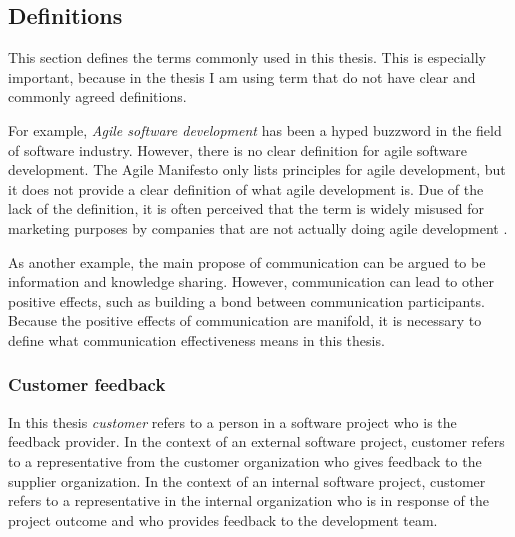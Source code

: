 \documentclass[english,12pt,a4paper,pdftex]{article}
\begin{document}
\subsection{Definitions}

This section defines the terms commonly used in this thesis. This is especially important, because in the thesis I am using term that do not have clear and commonly agreed definitions. 

For example, \emph{Agile software development} has been a hyped buzzword in the field of software industry. However, there is no clear definition for agile software development. The Agile Manifesto \citep{agilemanifesto} only lists principles for agile development, but it does not provide a clear definition of what agile development is. Due of the lack of the definition, it is often perceived that the term is widely misused for marketing purposes by companies that are not actually doing agile development \citep{signleton2012}.

As another example, the main propose of communication can be argued to be information and knowledge sharing. However, communication can lead to other positive effects, such as building a bond between communication participants. Because the positive effects of communication are manifold, it is necessary to define what communication effectiveness means in this thesis.

\subsubsection{Customer feedback}

In this thesis \textit{customer} refers to a person in a software project who is the feedback provider. In the context of an external software project, customer refers to a representative from the customer organization who gives feedback to the supplier organization. In the context of an internal software project, customer refers to a representative in the internal organization who is in response of the project outcome and who provides feedback to the development team.
\end{document}
